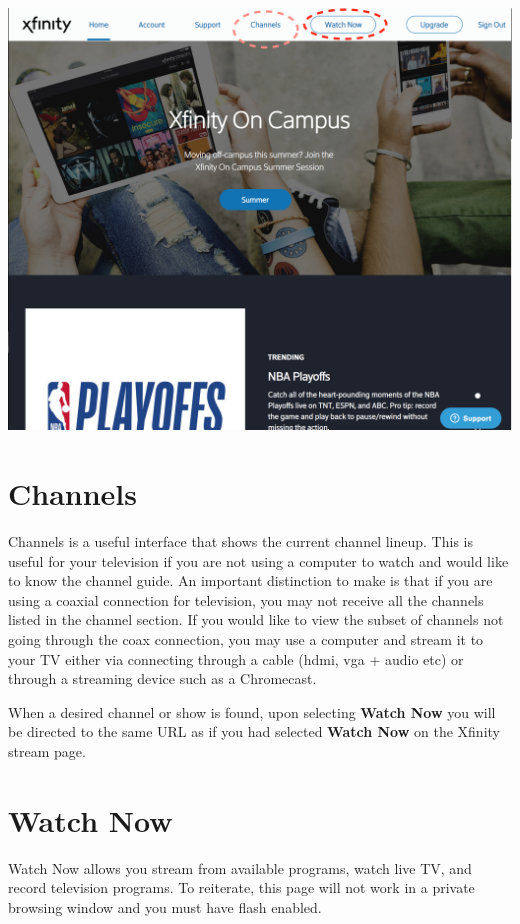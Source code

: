 \documentclass[a4paper, 11pt]{article}
\begin{document}
\includegraphics[width=\linewidth, keepaspectratio]{home.png}
\section*{
  Channels 
}

Channels is a useful interface that shows the current channel lineup.  This 
is useful for your television if you are not using a computer to watch and
would like to know the channel guide.  An important distinction to make is 
that if you are using a coaxial connection for television, you may not
receive all the channels listed in the channel section.  If you would like to
view the subset of channels not going through the coax connection, you may
use a computer and stream it to your TV either via connecting through a 
cable (hdmi, vga + audio etc) or through a streaming device such as a Chromecast.

When a desired channel or show is found, upon selecting \textbf{Watch Now} you
will be directed to the same URL as if you had selected \textbf{Watch Now} on
the Xfinity stream page.

\section*{
  Watch Now
}

Watch Now allows you stream from available programs, watch live TV, and record television programs.  To reiterate, this page will not work in a private 
browsing window and you must have flash enabled.  
\end{document}
